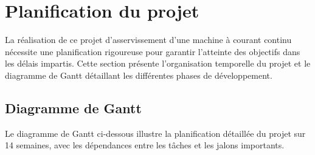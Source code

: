 \chapter*{Planification du projet}

La réalisation de ce projet d'asservissement d'une machine à courant continu nécessite une planification rigoureuse pour garantir l'atteinte des objectifs dans les délais impartis. Cette section présente l'organisation temporelle du projet et le diagramme de Gantt détaillant les différentes phases de développement.

\section{Diagramme de Gantt}

Le diagramme de Gantt ci-dessous illustre la planification détaillée du projet sur 14 semaines, avec les dépendances entre les tâches et les jalons importants.

